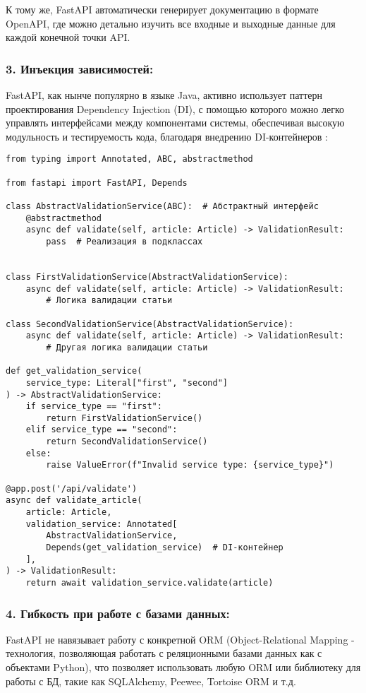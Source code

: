 К тому же, FastAPI автоматически генерирует документацию в формате OpenAPI,
где можно детально изучить все входные и выходные данные для каждой конечной точки API.

\subsubsection*{3. Инъекция зависимостей:}
FastAPI, как нынче популярно в языке Java, активно использует паттерн проектирования Dependency Injection (DI),
с помощью которого можно легко управлять интерфейсами между компонентами системы, обеспечивая высокую модульность 
и тестируемость кода, благодаря внедрению DI-контейнеров \cite{solid-principles-article,fastapi-bill, business-laguna}:

\begin{verbatim}
from typing import Annotated, ABC, abstractmethod

from fastapi import FastAPI, Depends

class AbstractValidationService(ABC):  # Абстрактный интерфейс
    @abstractmethod
    async def validate(self, article: Article) -> ValidationResult:
        pass  # Реализация в подклассах


class FirstValidationService(AbstractValidationService):
    async def validate(self, article: Article) -> ValidationResult:
        # Логика валидации статьи

class SecondValidationService(AbstractValidationService):
    async def validate(self, article: Article) -> ValidationResult:
        # Другая логика валидации статьи

def get_validation_service(
    service_type: Literal["first", "second"]
) -> AbstractValidationService:
    if service_type == "first":
        return FirstValidationService()
    elif service_type == "second":
        return SecondValidationService()
    else:
        raise ValueError(f"Invalid service type: {service_type}")

@app.post('/api/validate')
async def validate_article(
    article: Article,
    validation_service: Annotated[
        AbstractValidationService, 
        Depends(get_validation_service)  # DI-контейнер
    ],
) -> ValidationResult:
    return await validation_service.validate(article)
\end{verbatim}

\subsubsection*{4. Гибкость при работе с базами данных:}
FastAPI не навязывает работу с конкретной ORM 
(Object-Relational Mapping - технология, позволяющая работать с реляционными базами данных как с объектами Python),
что позволяет использовать любую ORM или библиотеку для работы с БД, такие как SQLAlchemy, Peewee, Tortoise ORM и т.д.

